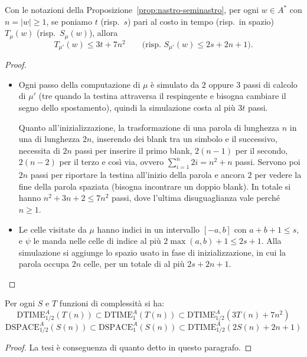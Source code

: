 \begin{lemm}
Con le notazioni della Proposizione~\ref{prop:nastro-seminastro}, per ogni $w\in A^*$ con $n=|w|\geq 1$, se poniamo $t$ (risp.\ $s$) pari al costo in tempo (risp.\ in spazio) $T_\mu(w)$ (risp.\ $S_\mu(w)$), allora
\[
T_{\mu'}(w)\leq 3t+7n^2
\qquad\text{(risp.\ } S_{\mu'}(w)\leq 2s+2n+1\text{)}.
\]

\begin{proof}\
\begin{itemize}
    \item[Tempo:]
 Ogni passo della computazione di $\mu$ è simulato da $2$ oppure $3$ passi di calcolo di $\mu'$ (tre quando la testina attraversa il respingente e bisogna cambiare il segno dello spostamento), quindi la simulazione costa al più $3t$ passi.

Quanto all'inizializzazione, la trasformazione di una parola di lunghezza $n$ in una di lunghezza $2n$, inserendo dei blank tra un simbolo e il successivo, necessita di $2n$ passi per inserire il primo blank, $2(n-1)$ per il secondo, $2(n-2)$ per il terzo e così via, ovvero $\sum_{i=1}^{n}2i=n^2+n$ passi. Servono poi $2n$ passi per riportare la testina all'inizio della parola e ancora $2$ per vedere la fine della parola spaziata (bisogna incontrare un doppio blank). In totale si hanno $n^2+3n+2\leq 7n^2$ passi, dove l'ultima disuguaglianza vale perché $n\geq1$.

\item[Spazio:]Le celle visitate da $\mu$ hanno indici in un intervallo $[-a,b]$ con $a+b+1\leq s$, e $\psi$ le manda nelle celle di indice al più $2\max(a,b)+1\leq 2s+1$. Alla simulazione si aggiunge lo spazio usato in fase di inizializzazione, in cui la parola occupa $2n$ celle, per un totale di al più $2s+2n+1$.
\end{itemize}
\end{proof}
\end{lemm}



\begin{coro}
Per ogni $S$ e $T$ funzioni di complessità si ha:
\[
\mathrm{DTIME}_{1/2}^A(T(n))\subset \mathrm{DTIME}_1^A(T(n))\subset \mathrm{DTIME}_{1/2}^A(3T(n)+7n^2)
\]
\[
\mathrm{DSPACE}_{1/2}^A(S(n))\subset \mathrm{DSPACE}_1^A(S(n))\subset \mathrm{DTIME}_{1/2}^A(2S(n)+2n+1)
\]
\begin{proof}
    La tesi è conseguenza di quanto detto in questo paragrafo.
\end{proof}
\end{coro}

